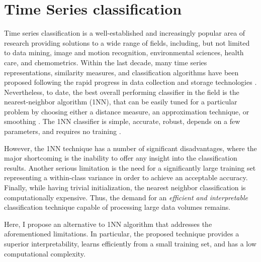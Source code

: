 \section{Time Series classification}
Time series classification is a well-established and increasingly popular area of research providing solutions to a wide 
range of fields, including, but not limited to data mining, image and motion recognition, environmental sciences, health care, 
and chemometrics. 
Within the last decade, many time series representations, similarity measures, and classification algorithms 
have been proposed following the rapid progress in data collection and storage technologies \cite{citeulike:10358271}. 
Nevertheless, to date, the best overall performing classifier in the field is the nearest-neighbor algorithm (1NN), 
that can be easily tuned for a particular problem by choosing either a distance measure, an approximation technique, 
or smoothing \cite{citeulike:10358271}.
The 1NN classifier is simple, accurate, robust, depends on a few parameters, and requires no training 
\cite{citeulike:10358271} \cite{citeulike:532340} \cite{citeulike:12563424}.


However, the 1NN technique has a number of significant disadvantages, where the major shortcoming is the 
inability to offer any insight into the classification results. 
Another serious limitation is the need for a significantly large training set representing a within-class 
variance in order to achieve an acceptable accuracy. 
Finally, while having trivial initialization, the nearest neighbor classification is computationally expensive. 
Thus, the demand for an \textit{efficient and interpretable} classification technique capable of processing 
large data volumes remains.

Here, I propose an alternative to 1NN algorithm that addresses the aforementioned limitations. 
In particular, the proposed technique provides a superior interpretability, learns efficiently from a small 
training set, and has a low computational complexity. 

